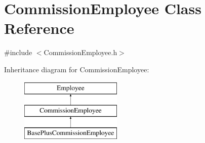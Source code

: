 \hypertarget{class_commission_employee}{}\section{Commission\+Employee Class Reference}
\label{class_commission_employee}


{\ttfamily \#include $<$Commission\+Employee.\+h$>$}

Inheritance diagram for Commission\+Employee\+:\begin{figure}[H]
\begin{center}
\leavevmode
\includegraphics[height=3.000000cm]{class_commission_employee}
\end{center}
\end{figure}
